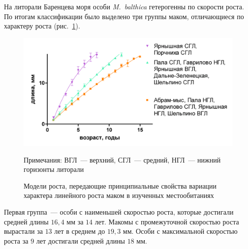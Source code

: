 {На литорали Баренцева моря особи \textit{M.~balthica} гетерогенны по скорости роста. 
По   итогам   классификации   было   выделено   три   группы   маком,   отличающиеся   по характеру роста (рис.~\ref{ris:Barents_clusters_gorizonts_all}).
    \begin{figure}[]
        \includegraphics[width=\textwidth]{../Barenc_Sea/growth_from_MSc/rost_clusters_all.jpg}
    \caption{Модели роста, передающие  принципиальные свойства вариации характера линейного роста маком в изученных местообитаниях}
\footnotesize{Примечания: ВГЛ~--- верхний, СГЛ~--- средний, НГЛ~--- нижний горизонты литорали}
    \label{ris:Barents_clusters_gorizonts_all}
    \end{figure}
Первая группа~--- особи с наименьшей скоростью роста, которые достигали средней длины $16,4$ мм за $14$ лет. 
Макомы с промежуточной   скоростью   роста   вырастали   за   $13$   лет в среднем   до   $19,3$   мм.   
Особи   с   максимальной скоростью роста за $9$ лет достигали средней длины $18$ мм.

}

